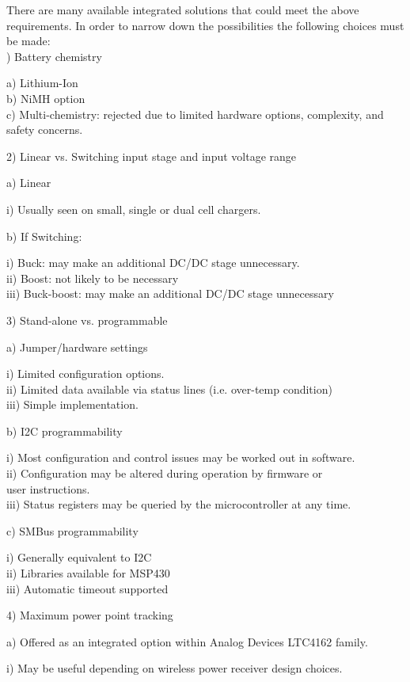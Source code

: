 \documentclass[12pt]{article}
\begin{document}
\indent
There are many available integrated solutions that could meet the above requirements. In order to narrow down the possibilities the following choices must be made:\\

) Battery chemistry
\begin{addmargin}[0.50cm]{0.75cm}
a) Lithium-Ion\\[0.25em]
b) NiMH option\\
c) Multi-chemistry: rejected due to limited hardware options, complexity, and \\ \indent safety concerns.
\end{addmargin}
2) Linear vs. Switching input stage and input voltage range
\begin{addmargin}[0.50cm]{0.75cm}
a) Linear
\begin{addmargin}[0.50cm]{0.75cm}
i) Usually seen on small, single or dual cell chargers.
\end{addmargin}
b) If Switching:
\begin{addmargin}[0.50cm]{0.75cm}
i) Buck: may make an additional DC/DC stage unnecessary.\\
ii) Boost: not likely to be necessary\\
iii) Buck-boost: may make an additional DC/DC stage unnecessary
\end{addmargin}
\end{addmargin}
3) Stand-alone vs. programmable
\begin{addmargin}[0.50cm]{0.75cm}
a) Jumper/hardware settings
\begin{addmargin}[0.50cm]{0.75cm}
i) Limited configuration options.\\
ii) Limited data available via status lines (i.e. over-temp condition)\\
iii) Simple implementation.
\end{addmargin}
b) I2C programmability
\begin{addmargin}[0.50cm]{0.75cm}
i) Most configuration and control issues may be worked out in software.\\
ii) Configuration may be altered during operation by firmware or \\ \indent user instructions.\\
iii) Status registers may be queried by the microcontroller at any time.
\end{addmargin}
c) SMBus programmability
\begin{addmargin}[0.50cm]{0.75cm}
i) Generally equivalent to I2C\\
ii) Libraries available for MSP430\\
iii) Automatic timeout supported
\end{addmargin}
\end{addmargin}
4) Maximum power point tracking
\begin{addmargin}[0.50cm]{0.75cm}
a) Offered as an integrated option within Analog Devices LTC4162 family.
\begin{addmargin}[0.50cm]{0.75cm}
i) May be useful depending on wireless power receiver design choices.\\
\end{addmargin}
\end{addmargin}
\end{document}
